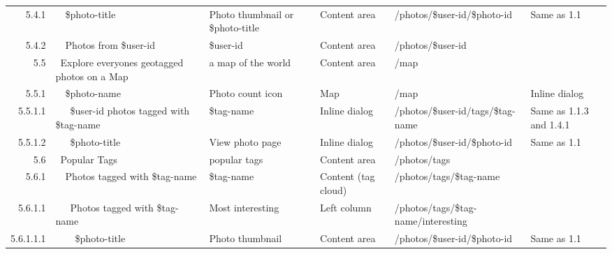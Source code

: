 \documentclass[12pt,a4paper]{article}
\begin{document}
\begin{landscape}
\begin{table}[h!b!p!]
\begin{center}
\begin{tiny}
\begin{tabular}{r|l|l|l|l|p{3cm}}
                5.4.1 &
                ~~\$photo-title &
                Photo thumbnail or \$photo-title &
                Content area &
                /photos/\$user-id/\$photo-id &
                Same as 1.1 \\

                5.4.2 &
                ~~Photos from \$user-id &
                \$user-id &
                Content area &
                /photos/\$user-id &
                \\

              5.5 &
              ~Explore everyones geotagged photos on a Map &
              a map of the world &
              Content area &
              /map &
              \\

                5.5.1 &
                ~~\$photo-name &
                Photo count icon &
                Map &
                /map &
                Inline dialog\\

                  5.5.1.1 &
                  ~~~\$user-id photos tagged with \$tag-name &
                  \$tag-name &
                  Inline dialog &
                  /photos/\$user-id/tags/\$tag-name &
                  Same as 1.1.3 and 1.4.1\\

                  5.5.1.2 &
                  ~~~\$photo-title &
                  View photo page &
                  Inline dialog &
                  /photos/\$user-id/\$photo-id &
                  Same as 1.1 \\

              5.6 &
              ~Popular Tags &
              popular tags &
              Content area &
              /photos/tags &
              \\

                5.6.1 &
                ~~Photos tagged with \$tag-name &
                \$tag-name &
                Content (tag cloud) &
                /photos/tags/\$tag-name &
                \\

                  5.6.1.1 &
                  ~~~Photos tagged with \$tag-name &
                  Most interesting &
                  Left column &
                  /photos/tags/\$tag-name/interesting &
                  \\

                    5.6.1.1.1 &
                    ~~~~\$photo-title &
                    Photo thumbnail &
                    Content area &
                    /photos/\$user-id/\$photo-id &
                    Same as 1.1 \\


\end{tabular}
\end{tiny}
\end{center}
\end{table}
\end{landscape}
\end{document}
